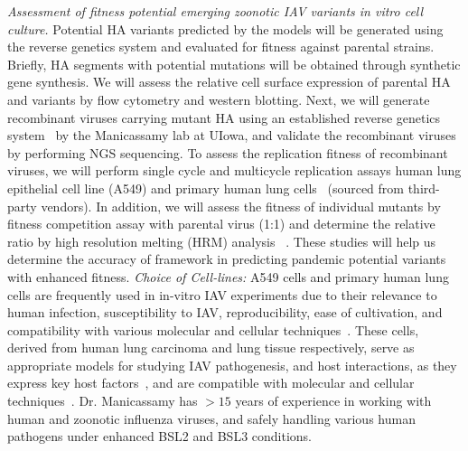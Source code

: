 \documentclass[onecolumn, compsoc,12pt]{IEEEtran}
\begin{document}
\textit{Assessment of fitness potential emerging zoonotic IAV variants in vitro cell culture.} Potential HA variants predicted by the \enet models will be generated using the reverse genetics system and evaluated for fitness against parental strains. Briefly, HA segments with potential mutations will be obtained through synthetic gene synthesis. We will assess the relative cell surface expression of parental HA and variants by flow cytometry and western
blotting. Next, we will generate recombinant viruses carrying mutant HA using an established reverse genetics system~\cite{pmid35926068,pmid34473799,pmid33970958,pmid32075925,pmid29899269,pmid28282445,pmid23686828,pmid20534532,pmid20126449} by the Manicassamy lab at UIowa, and validate the recombinant viruses by performing NGS sequencing. To assess the replication fitness of recombinant viruses, we will perform single cycle and multicycle replication assays human lung epithelial cell line (A549) and primary human lung cells~\cite{pmid23720581} (sourced from third-party vendors). In addition, we will assess the fitness of individual mutants by fitness competition assay with parental virus (1:1) and determine the relative ratio
by high resolution melting (HRM) analysis~\cite{ganti2021rab11a,wittwer2003high,marshall2013influenza} . These studies will help us determine the accuracy of \enet framework in predicting pandemic potential variants with enhanced fitness.  \textit{Choice of Cell-lines:} A549 cells and primary human lung cells are frequently used in in-vitro IAV experiments  due to their relevance to human infection, susceptibility to IAV, reproducibility, ease of cultivation, and compatibility with various molecular and cellular techniques~\cite{matrosovich1997avian}. These cells, derived from human lung carcinoma and lung tissue respectively, serve as appropriate models for studying IAV  pathogenesis, and host interactions, as they express key host factors~\cite{shinya2006influenza,chan2010tropism}, and are compatible with molecular and cellular techniques~\cite{neumann1999generation}. Dr. Manicassamy has $>15$ years of experience in working with human and zoonotic influenza viruses, and safely handling various human pathogens under enhanced BSL2 and BSL3 conditions.
\end{document}
